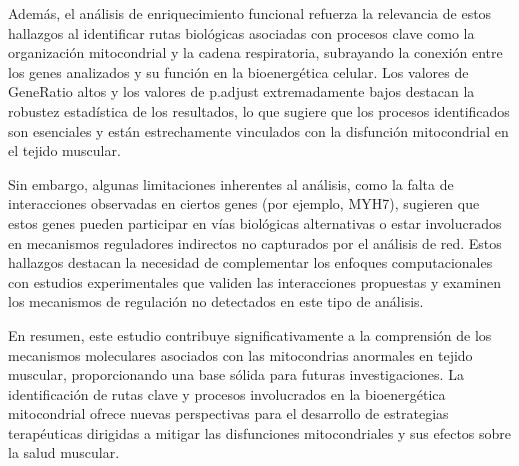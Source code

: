 Además, el análisis de enriquecimiento funcional refuerza la relevancia de estos hallazgos al identificar rutas biológicas asociadas con procesos clave como la organización mitocondrial y la cadena respiratoria, subrayando la conexión entre los genes analizados y su función en la bioenergética celular. Los valores de GeneRatio altos y los valores de p.adjust extremadamente bajos destacan la robustez estadística de los resultados, lo que sugiere que los procesos identificados son esenciales y están estrechamente vinculados con la disfunción mitocondrial en el tejido muscular.

Sin embargo, algunas limitaciones inherentes al análisis, como la falta de interacciones observadas en ciertos genes (por ejemplo, MYH7), sugieren que estos genes pueden participar en vías biológicas alternativas o estar involucrados en mecanismos reguladores indirectos no capturados por el análisis de red. Estos hallazgos destacan la necesidad de complementar los enfoques computacionales con estudios experimentales que validen las interacciones propuestas y examinen los mecanismos de regulación no detectados en este tipo de análisis.

En resumen, este estudio contribuye significativamente a la comprensión de los mecanismos moleculares asociados con las mitocondrias anormales en tejido muscular, proporcionando una base sólida para futuras investigaciones. La identificación de rutas clave y procesos involucrados en la bioenergética mitocondrial ofrece nuevas perspectivas para el desarrollo de estrategias terapéuticas dirigidas a mitigar las disfunciones mitocondriales y sus efectos sobre la salud muscular.
